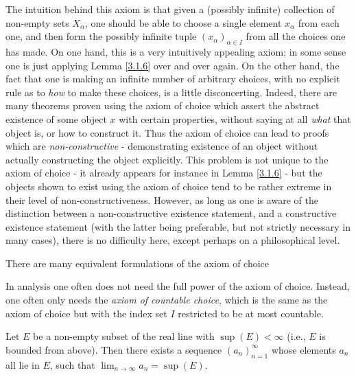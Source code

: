 \begin{remark}\label{8.4.3}
The intuition behind this axiom is that given a (possibly infinite) collection of non-empty sets \(X_{\alpha}\), one should be able to choose a single element \(x_{\alpha}\) from each one, and then form the possibly infinite tuple \((x_{\alpha})_{\alpha \in I}\) from all the choices one has made.
On one hand, this is a very intuitively appealing axiom;
in some sense one is just applying Lemma \ref{3.1.6} over and over again.
On the other hand, the fact that one is making an infinite number of arbitrary choices, with no explicit rule as to \emph{how} to make these choices, is a little disconcerting.
Indeed, there are many theorems proven using the axiom of choice which assert the abstract existence of some object \(x\) with certain properties, without saying at all \emph{what} that object is, or how to construct it.
Thus the axiom of choice can lead to proofs which are \emph{non-constructive} - demonstrating existence of an object without actually constructing the object explicitly.
This problem is not unique to the axiom of choice - it already appears for instance in Lemma \ref{3.1.6} - but the objects shown to exist using the axiom of choice tend to be rather extreme in their level of non-constructiveness.
However, as long as one is aware of the distinction between a non-constructive existence statement, and a constructive existence statement (with the latter being preferable, but not strictly necessary in many cases), there is no difficulty here, except perhaps on a philosophical level.
\end{remark}

\begin{remark}\label{8.4.4}
There are many equivalent formulations of the axiom of choice
\end{remark}

\begin{note}
In analysis one often does not need the full power of the axiom of choice.
Instead, one often only needs the \emph{axiom of countable choice}, which is the same as the axiom of choice but with the index set \(I\) restricted to be at most countable.
\end{note}

\begin{lemma}\label{8.4.5}
Let \(E\) be a non-empty subset of the real line with \(\sup(E) < \infty\)
(i.e., \(E\) is bounded from above).
Then there exists a sequence \((a_n)_{n = 1}^\infty\) whose elements \(a_n\) all lie in \(E\), such that \(\lim_{n \to \infty} a_n = \sup(E)\).
\end{lemma}

